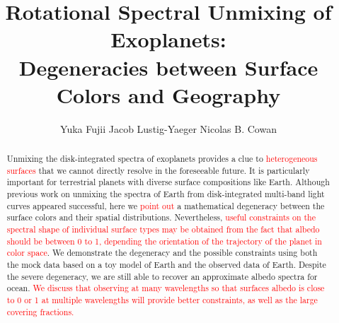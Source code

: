\documentclass[iop,numberedappendix,apj]{emulateapj}
\def\edit#1{\textcolor{red}{#1}}
\begin{document}
\title{Rotational Spectral Unmixing of Exoplanets:\\Degeneracies between Surface Colors and Geography}


\author{
%
Yuka Fujii 
%
Jacob Lustig-Yaeger 
%
Nicolas B. Cowan 
%
}

      
  







\vspace{0.5\baselineskip}


\begin{abstract}

Unmixing the disk-integrated spectra of exoplanets provides a clue to \edit{heterogeneous surfaces} that we cannot directly resolve in the foreseeable future. 
It is particularly important for terrestrial planets with diverse surface compositions like Earth. 
Although previous work on unmixing the spectra of Earth from disk-integrated multi-band light curves appeared successful, here we \edit{point out} a mathematical degeneracy between the surface colors and their spatial  distributions. 
Nevertheless, \edit{useful constraints on the spectral shape of individual surface types may be obtained from the fact that albedo should be between 0 to 1, depending the orientation of the trajectory of the planet in color space}.  
We demonstrate the degeneracy and the possible constraints using both the mock data based on a toy model of Earth and the observed data of Earth. 
Despite the severe degeneracy, we are still able to recover an approximate albedo spectra for ocean. 
\edit{We discuss that observing at many wavelengths so that surfaces albedo is close to 0 or 1 at multiple wavelengths will provide better constraints, as well as the large covering fractions. }

\end{abstract}
\end{document}
